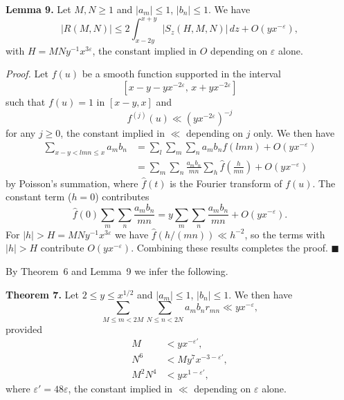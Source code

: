 \documentclass[10pt]{article}
\begin{document}
\medskip
\noindent\textbf{Lemma 9.}
Let $M,N\ge1$ and $|a_m|\le1$, $|b_n|\le1$. We have
\[
 |R(M,N)|\le2\int_{x-2y}^{x+y}|S_z(H,M,N)|\,dz
 +O(yx^{-\varepsilon}),
\]
with $H=MNy^{-1}x^{3\varepsilon}$, the constant implied in $O$ depending
on $\varepsilon$ alone.

\medskip
\noindent\textit{Proof.}
Let $f(u)$ be a smooth function supported in the interval
\[
 [x-y-yx^{-2\varepsilon},\,x+yx^{-2\varepsilon}]
\]
such that $f(u)=1$ in $[x-y,x]$ and
\[
 f^{(j)}(u)\ll(yx^{-2\varepsilon})^{-j}
\]
for any $j\ge0$, the constant implied in $\ll$ depending on $j$ only.
We then have
\[
\begin{aligned}
\sum_{x-y<lmn\le x}a_mb_n
 &=\sum_l\sum_m\sum_n a_mb_nf(lmn)+O(yx^{-\varepsilon})\\
 &=\sum_m\sum_n\frac{a_mb_n}{mn}
   \sum_h\widehat f\left(\frac{h}{mn}\right)+O(yx^{-\varepsilon})
\end{aligned}
\]
by Poisson's summation, where $\widehat f(t)$ is the Fourier transform of
$f(u)$. The constant term ($h=0$) contributes
\[
 \widehat f(0)\sum_m\sum_n\frac{a_mb_n}{mn}
 =y\sum_m\sum_n\frac{a_mb_n}{mn}+O(yx^{-\varepsilon}).
\]
For $|h|>H=MNy^{-1}x^{3\varepsilon}$ we have
$\widehat f(h/(mn))\ll h^{-2}$, so the terms with $|h|>H$ contribute
$O(yx^{-\varepsilon})$. Combining these results completes the proof.
\(\blacksquare\)

By Theorem~6 and Lemma~9 we infer the following.

\medskip
\noindent\textbf{Theorem 7.}
Let $2\le y\le x^{1/2}$ and $|a_m|\le1$, $|b_n|\le1$. We then have
\begin{equation*}
 \sum_{M\le m<2M}\sum_{N\le n<2N}a_mb_nr_{mn}
 \ll yx^{-\varepsilon},
\tag{7.3}
\end{equation*}
provided
\begin{align*}
 M&<yx^{-\varepsilon'},                                      \tag{7.4}\\
 N^6&<My^7x^{-3-\varepsilon'},                               \tag{7.5}\\
 M^2N^4&<yx^{1-\varepsilon'},                                \tag{7.6}
\end{align*}
where $\varepsilon'=48\varepsilon$, the constant implied in $\ll$
depending on $\varepsilon$ alone.
\end{document}

